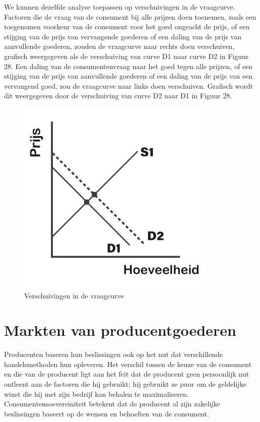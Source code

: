 We kunnen dezelfde analyse toepassen op verschuivingen in de vraagcurve. Factoren die de vraag van de consument bij alle prijzen doen toenemen, zoals een toegenomen voorkeur van de consument voor het goed ongeacht de prijs, of een stijging van de prijs van vervangende goederen of een daling van de prijs van aanvullende goederen, zouden de vraagcurve naar rechts doen verschuiven, grafisch weergegeven als de verschuiving van curve D1 naar curve D2 in Figuur 28. Een daling van de consumentenvraag naar het goed tegen alle prijzen, of een stijging van de prijs van aanvullende goederen of een daling van de prijs van een vervangend goed, zou de vraagcurve naar links doen verschuiven. Grafisch wordt dit weergegeven door de verschuiving van curve D2 naar D1 in Figuur 28.

\begin{figure}[h]
\centering
    \includegraphics[]{figures/fig28-1.png}
    \caption[Verschuivingen in de vraagcurve]{Verschuivingen in de vraagcurve}
    \label{fig28}
\end{figure}

\hypertarget{markten-van-producentgoederen}{%
\section{Markten van producentgoederen}\label{markten-van-producentgoederen}}

Producenten baseren hun beslissingen ook op het nut dat verschillende handelsmethoden hun opleveren. Het verschil tussen de keuze van de consument en die van de producent ligt aan het feit dat de producent geen persoonlijk nut ontleent aan de factoren die hij gebruikt; hij gebruikt ze puur om de geldelijke winst die hij met zijn bedrijf kan behalen te maximaliseren. Consumentensoevereiniteit betekent dat de producent al zijn zakelijke beslissingen baseert op de wensen en behoeften van de consument.

